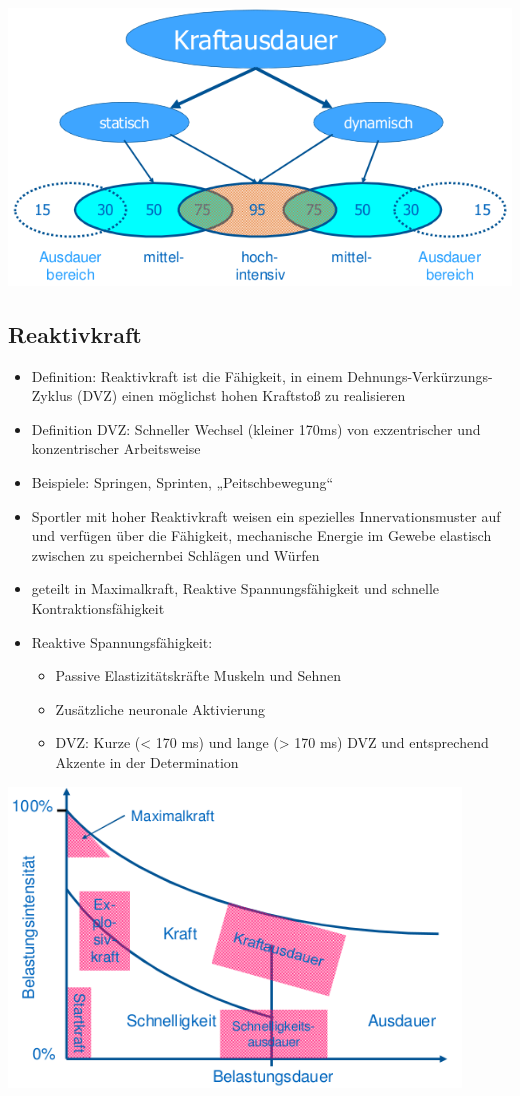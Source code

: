  \includegraphics[width=\textwidth]{pictures/kraftausdauer}

 \subsection{Reaktivkraft}

 \begin{itemize}
    \item Definition: Reaktivkraft ist die Fähigkeit, in einem Dehnungs-Verkürzungs-Zyklus (DVZ) einen möglichst hohen Kraftstoß zu realisieren
    \item Definition DVZ: Schneller Wechsel (kleiner 170ms) von exzentrischer und konzentrischer Arbeitsweise
    \item Beispiele: Springen, Sprinten, „Peitschbewegung“
    \item Sportler mit hoher Reaktivkraft weisen ein spezielles Innervationsmuster auf und verfügen über die Fähigkeit, mechanische Energie im Gewebe elastisch zwischen zu speichernbei Schlägen und Würfen
    \item geteilt in Maximalkraft, Reaktive Spannungsfähigkeit und schnelle Kontraktionsfähigkeit
    \item Reaktive Spannungsfähigkeit:
    \begin{itemize}
        \item Passive Elastizitätskräfte Muskeln und Sehnen
        \item Zusätzliche neuronale Aktivierung
        \item DVZ: Kurze (< 170 ms) und lange (> 170 ms) DVZ und entsprechend Akzente in der Determination
    \end{itemize}
\end{itemize}

\includegraphics[width=0.90\textwidth]{pictures/landkarte}


